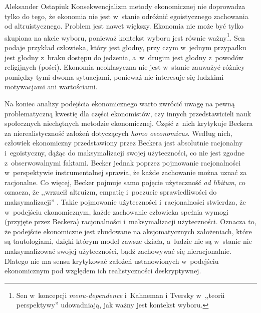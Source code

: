 \begin{artplenv}{Aleksander Ostapiuk}
Konsekwencjalizm metody ekonomicznej nie doprowadza tylko do tego, że ekonomia nie jest w~stanie odróżnić
egoistycznego zachowania od altruistycznego. Problem jest nawet większy. Ekonomia nie może być tylko skupiona na akcie
wyboru, ponieważ kontekst wyboru jest równie ważny\footnote{%
Sen
\parencite*[s.~130]{sen_rationality_2002}
w~koncepcji
\textit{menu-dependence} i~Kahneman i Tversky
\parencite*{kahneman_prospect_1979}
w~,,teorii perspektywy'' udowadniają, jak
ważny jest kontekst wyboru.}. Sen
\parencite*[s.~75]{sen_development_1999}
podaje przykład człowieka, który jest głodny,
przy czym w~jednym przypadku jest głodny z~braku dostępu do jedzenia, a~w~drugim jest głodny z~powodów religijnych
(pości). Ekonomia neoklasyczna nie jest w~stanie zauważyć różnicy pomiędzy tymi dwoma sytuacjami, ponieważ nie
interesuje się ludzkimi motywacjami ani wartościami.

Na koniec analizy podejścia ekonomicznego warto zwrócić uwagę na pewną problematyczną kwestię dla części
ekonomistów, czy innych przedstawicieli nauk społecznych niechętnych metodzie ekonomicznej. Część z~nich
krytykuje Beckera za nierealistyczność założeń dotyczących \textit{homo oeconomicus}. Według nich, człowiek ekonomiczny
przedstawiony przez Beckera jest absolutnie racjonalny i~egoistyczny, dążąc do maksymalizacji swojej użyteczności, co
nie jest zgodne z~obserwowalnymi faktami. Becker jednak poprzez pojmowanie racjonalności w~perspektywie instrumentalnej
sprawia, że każde zachowanie można uznać za racjonalne. Co więcej, Becker pojmuje samo pojęcie użyteczność \textit{ad
libitum}, co oznacza, że ,,wrzucił altruizm, empatię i~poczucie sprawiedliwości do \guillemotright maksymalizacji''
\parencite[s.~74–75]{ostapiuk_moralna_2017}.
Takie pojmowanie użyteczności i~racjonalności stwierdza,
że w~podejściu ekonomicznym, każde zachowanie człowieka spełnia wymogi (przyjęte przez Beckera)
racjonalności i~maksymalizacji użyteczności. Oznacza to, że podejście ekonomiczne jest zbudowane na aksjomatycznych założeniach, które
są tautologiami, dzięki którym model zawsze działa, a~ludzie nie są w~stanie nie maksymalizować swojej użyteczności,
bądź zachowywać się nieracjonalnie. Dlatego nie ma sensu krytykować założeń ustanowionych w~podejściu
ekonomicznym pod względem ich realistyczności deskryptywnej. 


\end{artplenv}
